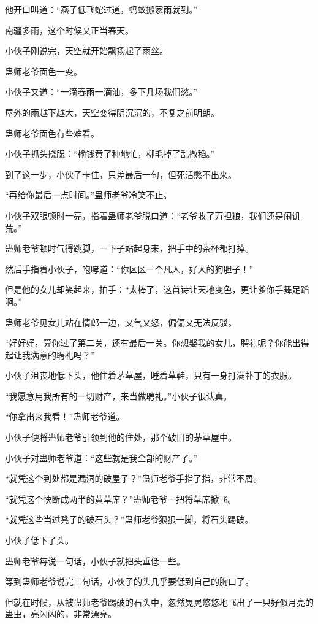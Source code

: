 \begin{this_body}
他开口叫道：“燕子低飞蛇过道，蚂蚁搬家雨就到。”

南疆多雨，这个时候又正当春天。

小伙子刚说完，天空就开始飘扬起了雨丝。

蛊师老爷面色一变。

小伙子又道：“一滴春雨一滴油，多下几场我们愁。”

屋外的雨越下越大，天空变得阴沉沉的，不复之前明朗。

蛊师老爷面色有些难看。

小伙子抓头挠腮：“榆钱黄了种地忙，柳毛掉了乱撒稻。”

到了这一步，小伙子卡住，只差最后一句，但死活憋不出来。

“再给你最后一点时间。”蛊师老爷冷笑不止。

小伙子双眼顿时一亮，指着蛊师老爷脱口道：“老爷收了万担粮，我们还是闹饥荒。”

蛊师老爷顿时气得跳脚，一下子站起身来，把手中的茶杯都打掉。

然后手指着小伙子，咆哮道：“你区区一个凡人，好大的狗胆子！”

但是他的女儿却笑起来，拍手：“太棒了，这首诗让天地变色，更让爹你手舞足蹈啊。”

蛊师老爷见女儿站在情郎一边，又气又怒，偏偏又无法反驳。

“好好好，算你过了第二关，还有最后一关。你想娶我的女儿，聘礼呢？你能出得起让我满意的聘礼吗？”

小伙子沮丧地低下头，他住着茅草屋，睡着草鞋，只有一身打满补丁的衣服。

“我愿意用我所有的一切财产，来当做聘礼。”小伙子很认真。

“你拿出来我看！”蛊师老爷道。

小伙子便将蛊师老爷引领到他的住处，那个破旧的茅草屋中。

小伙子对蛊师老爷道：“这些就是我全部的财产了。”

“就凭这个到处都是漏洞的破屋子？”蛊师老爷手指了指，非常不屑。

“就凭这个快断成两半的黄草席？”蛊师老爷一把将草席掀飞。

“就凭这些当过凳子的破石头？”蛊师老爷狠狠一脚，将石头踢破。

小伙子低下了头。

蛊师老爷每说一句话，小伙子就把头垂低一些。

等到蛊师老爷说完三句话，小伙子的头几乎要低到自己的胸口了。

但就在时候，从被蛊师老爷踢破的石头中，忽然晃晃悠悠地飞出了一只好似月亮的蛊虫，亮闪闪的，非常漂亮。


\end{this_body}
